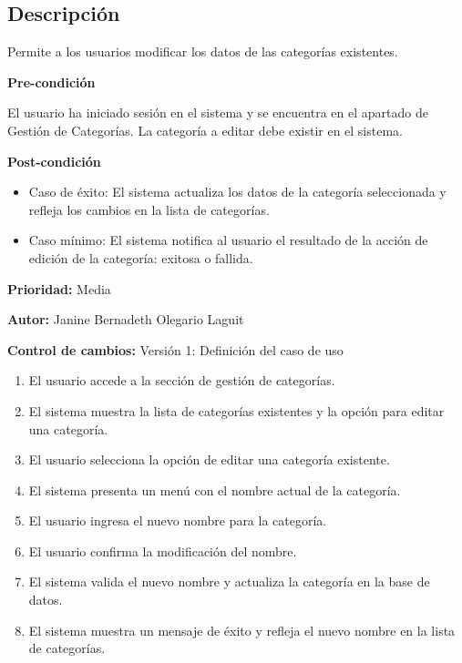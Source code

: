 
\subsection*{Descripción}
Permite a los usuarios modificar los datos de las categorías existentes.\par
\vspace{0.15cm}

\textbf{Pre-condición}\par
El usuario ha iniciado sesión en el sistema y se encuentra en el apartado de Gestión de Categorías. La categoría a editar debe existir en el sistema.\par
\vspace{0.15cm}

\textbf{Post-condición}
\begin{itemize}
    \item Caso de éxito: El sistema actualiza los datos de la categoría seleccionada y refleja los cambios en la lista de categorías.
    \item Caso mínimo: El sistema notifica al usuario el resultado de la acción de edición de la categoría: exitosa o fallida.
\end{itemize}

\textbf{Prioridad: }
Media
\vspace{0.15cm}

\textbf{Autor: }
Janine Bernadeth Olegario Laguit\par
\vspace{0.15cm}

\textbf{Control de cambios: } Versión 1: Definición del caso de uso

\begin{enumerate}
    \item El usuario accede a la sección de gestión de categorías.
    \item El sistema muestra la lista de categorías existentes y la opción para editar una categoría.
    \item El usuario selecciona la opción de editar una categoría existente.
    \item El sistema presenta un menú con el nombre actual de la categoría.
    \item El usuario ingresa el nuevo nombre para la categoría.
    \item El usuario confirma la modificación del nombre.
    \item El sistema valida el nuevo nombre y actualiza la categoría en la base de datos.
    \item El sistema muestra un mensaje de éxito y refleja el nuevo nombre en la lista de categorías.
\end{enumerate}

